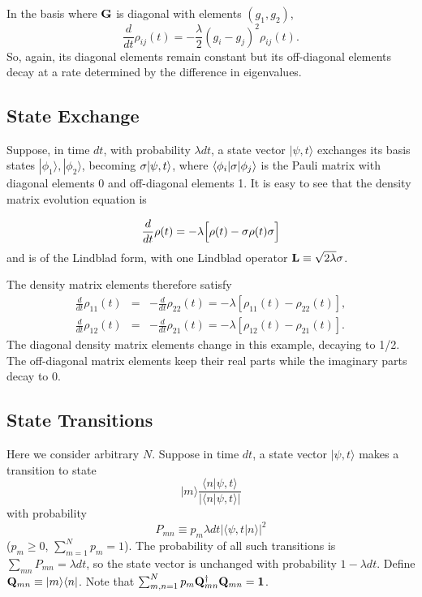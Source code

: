 \documentclass[aps,pra,amssymb, amsfonts,amsmath,showpacs, superscriptaddress,12pt]{revtex4}
\begin{document}
In the basis where ${\bf G}$ is diagonal with elements $(g_{1},g_{2})$, 
\[
\frac{d}{dt}\rho_{ij}(t)=-\frac{\lambda}{2}(g_{i}-g_{j})^{2}\rho_{ij}(t). 
\]
\noindent So, again, its diagonal elements remain constant but its off-diagonal elements decay at a rate determined by the difference in eigenvalues. 

\subsection{State Exchange}
Suppose, in time $dt$, with probability $\lambda dt$, a state vector $|\psi, t\rangle$  exchanges its basis states $|\phi_{1}\rangle, |\phi_{2}\rangle$, becoming ${\bf\sigma}|\psi, t\rangle$, where  
$\langle\phi_{i}| {\bf \sigma}|\phi_{j}\rangle$ is the Pauli matrix with diagonal elements 0 and off-diagonal elements 1.    It is easy to see that the density matrix evolution equation is 

\[
\frac{d}{dt}{\bf \rho}(t)=-\lambda\Big[{\bf \rho}(t)-{\bf\sigma} {\bf \rho}(t){\bf\sigma}\Big]
\] 
\noindent and  is of the Lindblad form, with one Lindblad operator ${\bf L}\equiv \sqrt{2\lambda}{\bf\sigma}$.

The density matrix elements therefore satisfy
\begin{eqnarray}
\frac{d}{dt} \rho_{11}(t)&=&-\frac{d}{dt} \rho_{22}(t)=- \lambda[\rho_{11}(t)- \rho_{22}(t)],\nonumber\\
\frac{d}{dt} \rho_{12}(t)&=&-\frac{d}{dt} \rho_{21}(t)=- \lambda[\rho_{12}(t)- \rho_{21}(t)].\nonumber
\end{eqnarray}
\noindent The diagonal density matrix elements change in this example, decaying to 1/2.  The off-diagonal matrix elements keep their real parts while the imaginary parts decay to 0.

\subsection{State Transitions}
Here we consider arbitrary $N$. Suppose in time $dt$, a state vector $|\psi, t\rangle$  makes a transition to state  
\[
|m\rangle \frac{\langle n| \psi, t\rangle}{|\langle n| \psi, t\rangle|}
\]
\noindent with probability
\[
P_{mn}\equiv p_{m} \lambda dt|\langle \psi, t| n\rangle|^{2}
\]
\noindent ($p_{m}\geq 0$,  $ \sum_{m=1}^{N}p_{m}=1$).  The probability of all such transitions is $\sum_{mn}P_{mn}=\lambda dt$, so the state vector is unchanged with probability $1-\lambda dt$.  Define  
${\bf Q}_{mn}\equiv | m\rangle \langle n|$.   Note that 
$\sum_{m,n=1}^{N}p_{m}{\bf Q}_{mn}^{\dagger}{\bf Q}_{mn}={\bf 1}$.
\end{document}
